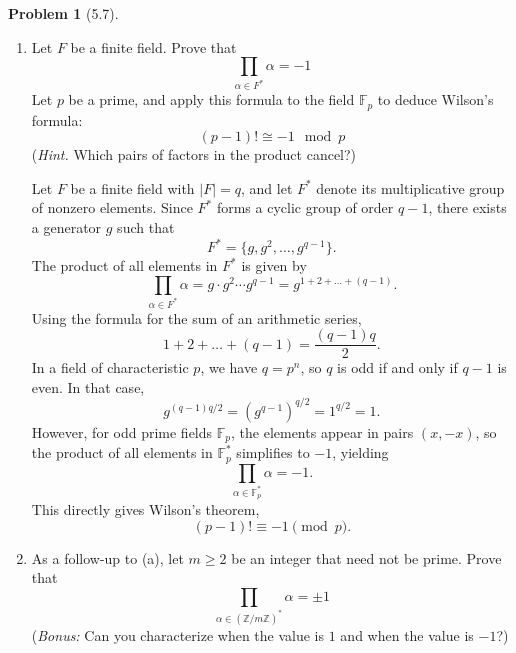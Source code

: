 \documentclass[12pt]{article}
\theoremstyle{definition}
\newtheorem{problem}{Problem}
\begin{document}
\begin{problem}[5.7]
    \phantom{.}
    \begin{enumerate}[label=(\alph*)]
        \item Let $F$ be a finite field. Prove that
              \[
                  \prod_{\alpha\in F^*} \alpha = -1  
              \]
              Let $p$ be a prime, and apply this formula to the field $\mathbb{F}_p$ to deduce Wilson's formula:
              \[
                  (p - 1)! \cong -1 \mod p
              \]
              (\textit{Hint.} Which pairs of factors in the product cancel?)

              \begin{solution}
                Let $F$ be a finite field with $|F| = q$, and let $F^*$ denote its multiplicative group of nonzero elements. Since $F^*$ forms a cyclic group of order $q - 1$, there exists a generator $g$ such that 
                \[ F^* = \{ g, g^2, \dots, g^{q-1} \}. \]
                The product of all elements in $F^*$ is given by
                \[ \prod_{\alpha \in F^*} \alpha = g \cdot g^2 \cdots g^{q-1} = g^{1+2+\dots+(q-1)}. \]
                Using the formula for the sum of an arithmetic series,
                \[ 1+2+\dots+(q-1) = \frac{(q-1)q}{2}. \]
                In a field of characteristic $p$, we have $q = p^n$, so $q$ is odd if and only if $q - 1$ is even. In that case, 
                \[ g^{(q-1)q/2} = (g^{q-1})^{q/2} = 1^{q/2} = 1. \]
                However, for odd prime fields $\mathbb{F}_p$, the elements appear in pairs $(x, -x)$, so the product of all elements in $\mathbb{F}_p^*$ simplifies to $-1$, yielding
                \[ \prod_{\alpha \in \mathbb{F}_p^*} \alpha = -1. \]
                This directly gives Wilson's theorem,
                \[ (p-1)! \equiv -1 \pmod{p}. \]
              \end{solution}

        \item As a follow-up to (a), let $m \geq 2$ be an integer that need not be prime. Prove that
              \[
                  \prod_{\alpha \in (\mathbb{Z}/m\mathbb{Z})^*} \alpha = \pm 1
              \]
              (\textit{Bonus:} Can you characterize when the value is $1$ and when the value is $-1$?)


\end{enumerate}
\end{problem}
\end{document}
